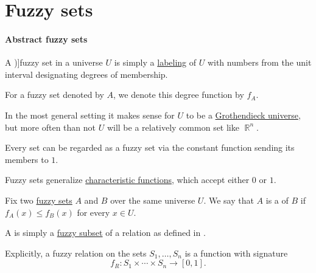 \section{Fuzzy sets}\label{sec:fuzzy_sets}

\paragraph{Abstract fuzzy sets}

\begin{definition}\label{def:fuzzy_set}
  A \term[ru=нечёткое множество (\cite[def. 1.1.1]{Орловский1981НечёткиеМножества})]{fuzzy set} in a universe \( U \) is simply a \hyperref[def:labeled_set]{labeling} of \( U \) with numbers from the unit interval designating degrees of membership.

  For a fuzzy set denoted by \( A \), we denote this degree function by \( f_A \).
\end{definition}
\begin{comments}
  \item In the most general setting it makes sense for \( U \) to be a \hyperref[def:grothendieck_universe]{Grothendieck universe}, but more often than not \( U \) will be a relatively common set like \( \BbbR^n \).

  \item Every set can be regarded as a fuzzy set via the constant function sending its members to \( 1 \).

  \item Fuzzy sets generalize \hyperref[def:subset_characteristic_function]{characteristic functions}, which accept either \( 0 \) or \( 1 \).
\end{comments}

\begin{definition}\label{def:fuzzy_subset}
  Fix two \hyperref[def:fuzzy_set]{fuzzy sets} \( A \) and \( B \) over the same universe \( U \). We say that \( A \) is a  of \( B \) if \( f_A(x) \leq f_B(x) \) for every \( x \in U \).
\end{definition}

\begin{definition}\label{def:fuzzy_relation}
  A  is simply a \hyperref[def:fuzzy_set]{fuzzy subset} of a relation as defined in .

  Explicitly, a fuzzy relation on the sets \( S_1, \ldots, S_n \) is a function with signature
  \begin{equation*}
    f_R: S_1 \times \cdots \times S_n \to [0, 1].
  \end{equation*}
\end{definition}


